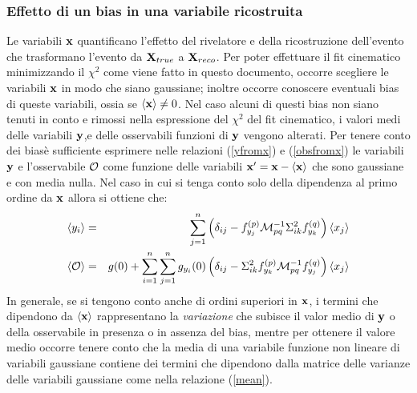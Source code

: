 \subsubsection{Effetto di un bias in una variabile ricostruita}
Le variabili ${\bf x}$ quantificano l'effetto del rivelatore e della ricostruzione
dell'evento che trasformano l'evento da ${\bf X}_{true}$ a ${\bf X}_{reco}$. Per poter
effettuare il fit cinematico minimizzando il $\chi^2$ come viene fatto in questo
documento, occorre scegliere le variabili ${\bf x}$ in modo che siano gaussiane; inoltre
occorre conoscere eventuali bias di queste variabili, ossia se $\langle{\bf x}\rangle\neq0$. Nel caso alcuni di questi bias non siano tenuti in conto e rimossi nella
espressione del $\chi^2$ del fit cinematico, i valori medi delle variabili ${\bf y}$,e delle osservabili funzioni di ${\bf y}$ vengono alterati. Per tenere conto dei bias\`e sufficiente esprimere nelle relazioni (\ref{yfromx}) e (\ref{obsfromx}) le variabili ${\bf y}$ e l'osservabile ${\cal O}$ come funzione delle variabili ${\bf x}^\prime={\bf x}-\langle{\bf x}\rangle$ che sono gaussiane e con media nulla. Nel caso in cui
si tenga conto solo della dipendenza al primo ordine da ${\bf x}$ allora si ottiene che:
\begin{eqnarray}
\label{ybias}\langle y_i\rangle&=&\sum_{j=1}^n\left(\delta_{ij}-f^{(p)}_{y_j}{\cal M}^{-1}_{pq}\Sigma^2_{ik}f^{(q)}_{y_k}\right)\langle x_j\rangle\\
\label{obsbias}\langle{\cal O}\rangle&=&g(0)+\sum_{i=1}^n\sum_{j=1}^n g_{y_i}(0)\left(\delta_{ij}-\Sigma^2_{ik}f^{(p)}_{y_k}{\cal M}^{-1}_{pq}f^{(q)}_{y_j}\right)\langle x_j\rangle
\end{eqnarray}
In generale, se si tengono conto anche di ordini superiori in ${\bf x}$, i termini
che dipendono da $\langle{\bf x}\rangle$ rappresentano la {\em variazione} che subisce
il valor medio di ${\bf y}$ o della osservabile in presenza o in assenza del bias, mentre
per ottenere il valore medio occorre tenere conto che la media di una variabile funzione non lineare di variabili gaussiane contiene dei termini che dipendono dalla
matrice delle varianze delle variabili gaussiane come nella relazione (\ref{mean}). 
%
